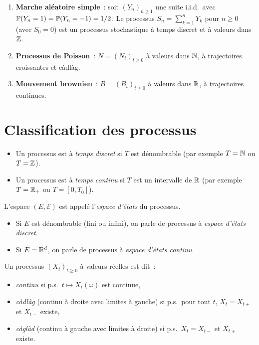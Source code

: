 \begin{exemple}
\begin{enumerate}
  \item \textbf{Marche al\'eatoire simple}~: soit $(Y_n)_{n \geq 1}$ une suite i.i.d.\ avec
    $\mathbb{P}(Y_n = 1) = \mathbb{P}(Y_n = -1) = 1/2$. Le processus $S_n = \sum_{k=1}^{n} Y_k$
    pour $n \geq 0$ (avec $S_0 = 0$) est un processus stochastique \`a temps discret
    et \`a valeurs dans $\mathbb{Z}$.
  \item \textbf{Processus de Poisson}~: $N = (N_t)_{t \geq 0}$ \`a valeurs dans $\mathbb{N}$,
    \`a trajectoires croissantes et c\`adl\`ag.
  \item \textbf{Mouvement brownien}~: $B = (B_t)_{t \geq 0}$ \`a valeurs dans $\mathbb{R}$,
    \`a trajectoires continues.
\end{enumerate}
\end{exemple}

\section{Classification des processus}

\begin{definition}
\begin{itemize}
  \item Un processus est \`a \emph{temps discret} si $T$ est d\'enombrable
    (par exemple $T = \mathbb{N}$ ou $T = \mathbb{Z}$).
  \item Un processus est \`a \emph{temps continu} si $T$ est un intervalle de $\mathbb{R}$
    (par exemple $T = \mathbb{R}_+$ ou $T = [0, T_0]$).
\end{itemize}
\end{definition}

\begin{definition}
L'espace $(E, \mathcal{E})$ est appel\'e l'\emph{espace d'\'etats} du processus.
\begin{itemize}
  \item Si $E$ est d\'enombrable (fini ou infini), on parle de processus \`a
    \emph{espace d'\'etats discret}.
  \item Si $E = \mathbb{R}^d$, on parle de processus \`a \emph{espace d'\'etats continu}.
\end{itemize}
\end{definition}

\begin{definition}
Un processus $(X_t)_{t \geq 0}$ \`a valeurs r\'eelles est dit~:
\begin{itemize}
  \item \emph{continu} si p.s.\ $t \mapsto X_t(\omega)$ est continue,
  \item \emph{c\`adl\`ag} (continu \`a droite avec limites \`a gauche) si p.s.\
    pour tout $t$, $X_t = X_{t+}$ et $X_{t-}$ existe,
  \item \emph{c\`agl\`ad} (continu \`a gauche avec limites \`a droite) si p.s.\
    $X_t = X_{t-}$ et $X_{t+}$ existe.
\end{itemize}
\end{definition}

